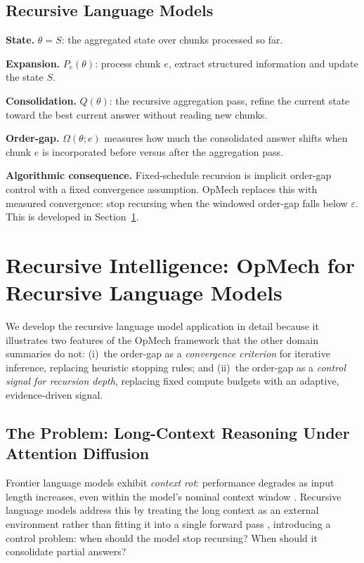 \documentclass[12pt,a4paper]{article}
\newcommand{\Ogap}{\Omega}
\begin{document}
\subsection{Recursive Language Models}
\label{sec:rlm_domain}

\textbf{State.}
$\theta = S$: the aggregated state over chunks processed so far.

\textbf{Expansion.}
$P_e(\theta)$: process chunk $e$, extract structured information and update
the state $S$.

\textbf{Consolidation.}
$Q(\theta)$: the recursive aggregation pass, refine the current state toward
the best current answer without reading new chunks.

\textbf{Order-gap.}
$\Ogap(\theta; e)$ measures how much the consolidated answer shifts when
chunk $e$ is incorporated before versus after the aggregation pass.

\textbf{Algorithmic consequence.}
Fixed-schedule recursion is implicit order-gap control with a fixed
convergence assumption. OpMech replaces this with measured convergence:
stop recursing when the windowed order-gap falls below $\varepsilon$.
This is developed in Section~\ref{sec:recursive_intelligence}.

\section{Recursive Intelligence: OpMech for Recursive Language Models}
\label{sec:recursive_intelligence}

We develop the recursive language model application in detail because it
illustrates two features of the OpMech framework that the other domain
summaries do not: (i)~the order-gap as a \emph{convergence criterion} for
iterative inference, replacing heuristic stopping rules; and (ii)~the
order-gap as a \emph{control signal for recursion depth}, replacing fixed compute
budgets with an adaptive, evidence-driven signal.

\subsection{The Problem: Long-Context Reasoning Under Attention Diffusion}

Frontier language models exhibit \emph{context rot}: performance degrades as
input length increases, even within the model's nominal context window
\citep{zhang2025rlm}. Recursive language models address this by treating the
long context as an external environment rather than fitting it into a single
forward pass \citep{zhang2025rlm}, introducing a control problem: when should
the model stop recursing? When should it consolidate partial answers?
\end{document}
